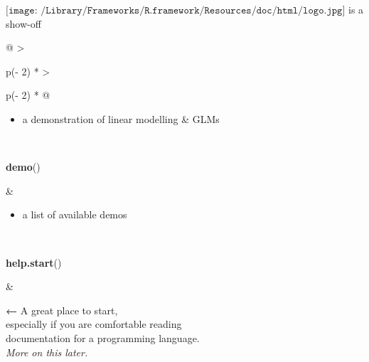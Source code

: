 \documentclass[
  11pt,
  ignorenonframetext,
]{beamer}
\newenvironment{Shaded}{\begin{snugshade}}{\end{snugshade}}
\newcommand{\FunctionTok}[1]{\textcolor[rgb]{0.13,0.29,0.53}{\textbf{#1}}}
\newcommand{\NormalTok}[1]{#1}
\providecommand{\tightlist}{%
  \setlength{\itemsep}{0pt}\setlength{\parskip}{0pt}}
\newlength\ShadedFrameSep
\newcommand{\ctop}{\vspace{\ShadedFrameSep}}  %
\begin{document}
\begin{frame}[fragile]{\(\texttt{[image: /Library/Frameworks/R.framework/Resources/doc/html/logo.jpg]}\)
is a show-off}
\begin{longtable}[]{@{}
  >{\raggedright\arraybackslash}p{(\columnwidth - 2\tabcolsep) * }
  >{\raggedright\arraybackslash}p{(\columnwidth - 2\tabcolsep) * }@{}}
\begin{minipage}[t]{\linewidth}
\begin{itemize}
\tightlist
\item
  a demonstration of linear modelling \& GLMs
\end{itemize}
\end{minipage} \\
\begin{minipage}[t]{\linewidth}\raggedright
\begin{Shaded}
\begin{Highlighting}[]
\FunctionTok{demo}\NormalTok{()}
\end{Highlighting}
\end{Shaded}
\end{minipage} & \begin{minipage}[t]{\linewidth}\raggedright
\begin{itemize}
\tightlist
\item
  a list of available demos
\end{itemize}
\end{minipage} \\
\begin{minipage}[t]{\linewidth}\raggedright
\begin{Shaded}
\begin{Highlighting}[]
\FunctionTok{help.start}\NormalTok{()}
\end{Highlighting}
\end{Shaded}
\end{minipage} & \begin{minipage}[t]{\linewidth}\raggedright
\ctop{}

\textbf{←} A great place to start,\\
\hspace*{0.333em}\hspace*{0.333em}\hspace*{0.333em}\hspace*{0.333em}especially
if you are comfortable reading\\
\hspace*{0.333em}\hspace*{0.333em}\hspace*{0.333em}\hspace*{0.333em}documentation
for a programming language.\\
\hspace*{0.333em}\hspace*{0.333em}\hspace*{0.333em}\hspace*{0.333em}\emph{More
on this later.}
\end{minipage} \\
\bottomrule\noalign{}
\end{longtable}


\end{frame}
\end{document}

